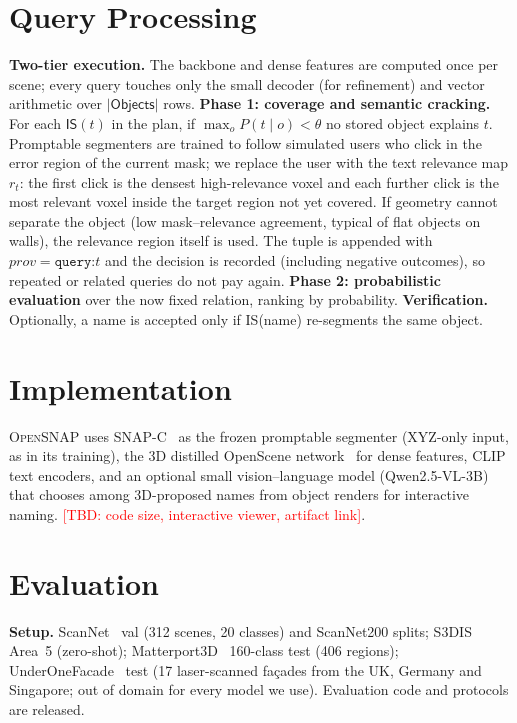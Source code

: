 \documentclass[conference]{IEEEtran}
\newcommand{\TBD}[1]{\textcolor{red}{[TBD: #1]}}
\newcommand{\sys}{\textsc{OpenSNAP}}
\begin{document}
\section{Query Processing}\label{sec:proc}
\textbf{Two-tier execution.} The backbone and dense features are computed once per scene; every query touches only
the small decoder (for refinement) and vector arithmetic over $|\textsf{Objects}|$ rows.
\textbf{Phase 1: coverage and semantic cracking.} For each $\textsf{IS}(t)$ in the plan, if $\max_o P(t\mid o)<\theta$
no stored object explains $t$. Promptable segmenters are trained to follow simulated users who click in the error region
of the current mask; we replace the user with the text relevance map $r_t$: the first click is the densest
high-relevance voxel and each further click is the most relevant voxel inside the target region not yet covered. If
geometry cannot separate the object (low mask--relevance agreement, typical of flat objects on walls), the relevance
region itself is used. The tuple is appended with $prov=\texttt{query:}t$ and the decision is recorded (including
negative outcomes), so repeated or related queries do not pay again.
\textbf{Phase 2: probabilistic evaluation} over the now fixed relation, ranking by probability.
\textbf{Verification.} Optionally, a name is accepted only if \textsf{IS}(name) re-segments the same object.

\section{Implementation}
\sys{} uses SNAP-C~\cite{snap} as the frozen promptable segmenter (XYZ-only input, as in its training), the 3D
distilled OpenScene network~\cite{openscene} for dense features, CLIP~\cite{clip} text encoders, and an optional small
vision--language model (Qwen2.5-VL-3B) that chooses among 3D-proposed names from object renders for interactive naming.
\TBD{code size, interactive viewer, artifact link}.

\section{Evaluation}\label{sec:exp}
\textbf{Setup.} ScanNet~\cite{scannet} val (312 scenes, 20 classes) and ScanNet200 splits; S3DIS~\cite{s3dis} Area~5
(zero-shot); Matterport3D~\cite{matterport} 160-class test (406 regions); UnderOneFacade~\cite{underonefacade} test
(17 laser-scanned fa\c{c}ades from the UK, Germany and Singapore; out of domain for every model we use). Evaluation code
and protocols are released.
\end{document}
